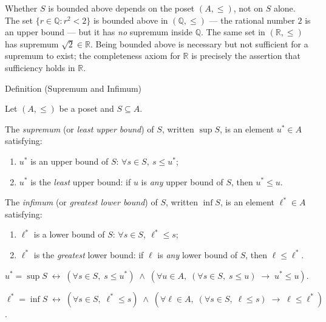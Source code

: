 \begin{remark*}
\label{rem:bounds-ambient}
Whether $S$ is bounded above depends on the poset $(A, \leq)$, not on
$S$ alone.  The set $\{r \in \mathbb{Q} : r^2 < 2\}$ is bounded above in
$(\mathbb{Q}, \leq)$ --- the rational number $2$ is an upper bound --- but
it has \emph{no} supremum inside $\mathbb{Q}$.  The same set in
$(\mathbb{R}, \leq)$ has supremum $\sqrt{2} \in \mathbb{R}$.  Being
bounded above is necessary but not sufficient for a supremum to exist;
the completeness axiom for $\mathbb{R}$ is precisely the assertion that
sufficiency holds in $\mathbb{R}$.
\end{remark*}


\begin{definitionbox}{Definition (Supremum and Infimum)}
\begin{definition}\label{def:sup-inf}
Let $(A, \leq)$ be a poset and $S \subseteq A$.

The \emph{supremum} (or \emph{least upper bound}) of $S$, written
$\sup S$, is an element $u^* \in A$ satisfying:
\begin{enumerate}[label=(\roman*)]
  \item $u^*$ is an upper bound of $S$: $\forall s \in S,\ s \leq u^*$;
  \item $u^*$ is the \emph{least} upper bound: if $u$ is \emph{any}
        upper bound of $S$, then $u^* \leq u$.
\end{enumerate}

The \emph{infimum} (or \emph{greatest lower bound}) of $S$, written
$\inf S$, is an element $\ell^* \in A$ satisfying:
\begin{enumerate}[label=(\roman*)]
  \item $\ell^*$ is a lower bound of $S$: $\forall s \in S,\ \ell^* \leq s$;
  \item $\ell^*$ is the \emph{greatest} lower bound: if $\ell$ is \emph{any}
        lower bound of $S$, then $\ell \leq \ell^*$.
\end{enumerate}
\end{definition}
\end{definitionbox}

\begin{remark*}
$u^* = \sup S \;\leftrightarrow\; (\forall s \in S,\; s \leq u^*) \;\wedge\;
(\forall u \in A,\; (\forall s \in S,\; s \leq u) \;\rightarrow\; u^* \leq u)$.

$\ell^* = \inf S \;\leftrightarrow\; (\forall s \in S,\; \ell^* \leq s) \;\wedge\;
(\forall \ell \in A,\; (\forall s \in S,\; \ell \leq s) \;\rightarrow\; \ell \leq \ell^*)$.
\end{remark*}

